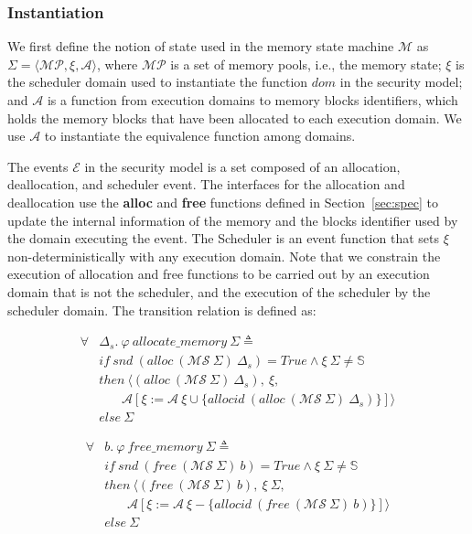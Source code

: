 \subsubsection{Instantiation}
We first define the notion of state used in the memory state machine $\mathcal{M}$ as $\Sigma = \langle \mathcal{MP}, \xi, \mathcal{A} \rangle$, where $\mathcal{MP}$ is a set of memory pools, i.e., the memory state; $\xi$ is the scheduler domain used to instantiate the function $dom$ in the security model; and $\mathcal{A}$ is a function from execution domains to memory blocks identifiers, which holds the memory blocks that have been allocated to each execution domain. We use $\mathcal{A}$ to instantiate the equivalence function among domains.

The events $\mathcal{E}$ in the security model is a set composed of an allocation, deallocation, and scheduler event. The interfaces for the allocation and deallocation use the \textbf{alloc} and \textbf{free} functions defined in Section~\ref{sec:spec} to update the internal information of the memory and the blocks identifier used by the domain executing the event. The Scheduler is an event function that sets $\xi$ non-deterministically with any execution domain. Note that we constrain the execution of allocation and free functions to be carried out by an execution domain that is not the scheduler, and the execution of the scheduler by the scheduler domain. The transition relation is defined as:

\begin{definition} 
\end{definition}
\vspace{-7pt}
\begin{align*}
\forall &\Delta_s.\ \varphi\ allocate\_memory\ \Sigma \triangleq\\
&if\ snd\ (alloc\ (\mathcal{MS}\ \Sigma)\ \Delta_s) = True \wedge \xi\ \Sigma \neq \mathbb{S}\\
&then\ \langle (alloc\ (\mathcal{MS}\ \Sigma)\ \Delta_s),\ \xi,\\
&\ \ \ \ \ \ \ \ \mathcal{A}[\xi := \mathcal{A}\ \xi \cup \lbrace allocid\ (alloc\ (\mathcal{MS}\ \Sigma)\ \Delta_s) \rbrace] \rangle\\
&else\ \Sigma
\end{align*}
\vspace{-12pt}

\begin{definition} 
\end{definition}
\vspace{-7pt}	
\begin{align*}
\forall &b.\ \varphi\ free\_memory\ \Sigma \triangleq\\ 
&if\ snd\ (free\ (\mathcal{MS}\ \Sigma)\ b) = True \wedge \xi\ \Sigma \neq \mathbb{S}\\
&then\ \langle (free\ (\mathcal{MS}\ \Sigma)\ b),\ \xi\ \Sigma,\\
&\ \ \ \ \ \ \ \ \mathcal{A}[\xi := \mathcal{A}\ \xi - \lbrace allocid\ (free\ (\mathcal{MS}\ \Sigma)\ b) \rbrace] \rangle\\
&else\ \Sigma
\end{align*}
\vspace{-12pt}

